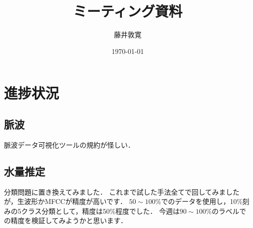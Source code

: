 \documentclass[a4j,10pt]{jarticle}
\title{ミーティング資料}
\author{藤井敦寛}
\date{\today}
\begin{document}
\maketitle

\section{進捗状況}

\subsection{脈波}
脈波データ可視化ツールの規約が怪しい．

\subsection{水量推定}
分類問題に置き換えてみました．
これまで試した手法全てで回してみましたが，生波形かMFCCが精度が高いです．
$50 \sim 100\%$でのデータを使用し，10\%刻みの5クラス分類として，精度は50\%程度でした．
今週は$90 \sim 100\%$のラベルでの精度を検証してみようかと思います．






\end{document}

